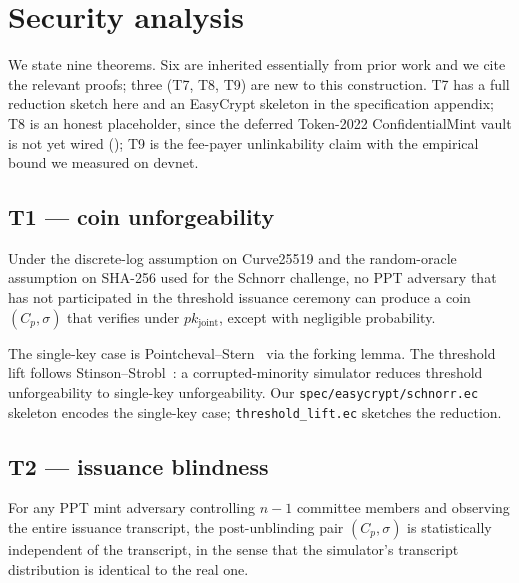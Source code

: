 \section{Security analysis}
\label{sec:security}

We state nine theorems. Six are inherited essentially from prior work and we cite the relevant proofs; three (T7, T8, T9) are new to this construction. T7 has a full reduction sketch here and an EasyCrypt skeleton in the specification appendix; T8 is an honest placeholder, since the deferred Token-2022 ConfidentialMint vault is not yet wired (); T9 is the fee-payer unlinkability claim with the empirical bound we measured on devnet.

\subsection{T1 --- coin unforgeability}
\label{sec:t1}

\begin{theorem}
\label{thm:T1}
Under the discrete-log assumption on Curve25519 and the random-oracle assumption on SHA-256 used for the Schnorr challenge, no PPT adversary that has not participated in the threshold issuance ceremony can produce a coin $(C_p, \sigma)$ that verifies under $pk_{\mathrm{joint}}$, except with negligible probability.
\end{theorem}

The single-key case is Pointcheval--Stern~\cite{pointchevalstern1996} via the forking lemma. The threshold lift follows Stinson--Strobl~\cite{stinsonstrobl2001}: a corrupted-minority simulator reduces threshold unforgeability to single-key unforgeability. Our \texttt{spec/easycrypt/schnorr.ec} skeleton encodes the single-key case; \texttt{threshold\_lift.ec} sketches the reduction.

\subsection{T2 --- issuance blindness}

\begin{theorem}
\label{thm:T2}
For any PPT mint adversary controlling $n - 1$ committee members and observing the entire issuance transcript, the post-unblinding pair $(C_p, \sigma)$ is statistically independent of the transcript, in the sense that the simulator's transcript distribution is identical to the real one.
\end{theorem}

